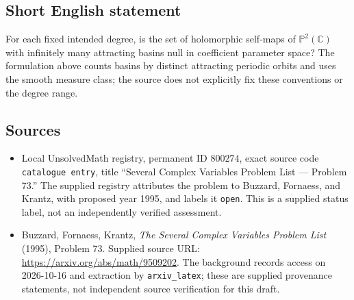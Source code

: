 \documentclass[11pt]{article}
\newcommand{\C}{\mathbb{C}}
\newcommand{\PP}{\mathbb{P}}
\begin{document}
\subsection{Short English statement}
For each fixed intended degree, is the set of holomorphic self-maps of \(\PP^2(\C)\) with infinitely many attracting basins null in coefficient parameter space? The formulation above counts basins by distinct attracting periodic orbits and uses the smooth measure class; the source does not explicitly fix these conventions or the degree range.
\subsection{Sources}
\begin{itemize}
\item Local UnsolvedMath registry, permanent ID \(800274\), exact source code \texttt{catalogue entry}, title ``Several Complex Variables Problem List --- Problem 73.'' The supplied registry attributes the problem to Buzzard, Fornaess, and Krantz, with proposed year 1995, and labels it \texttt{open}. This is a supplied status label, not an independently verified assessment.
\item Buzzard, Fornaess, Krantz, \emph{The Several Complex Variables Problem List} (1995), Problem 73. Supplied source URL: \url{https://arxiv.org/abs/math/9509202}. The background records access on 2026-10-16 and extraction by \texttt{arxiv\_latex}; these are supplied provenance statements, not independent source verification for this draft.
\end{itemize}
\end{document}
